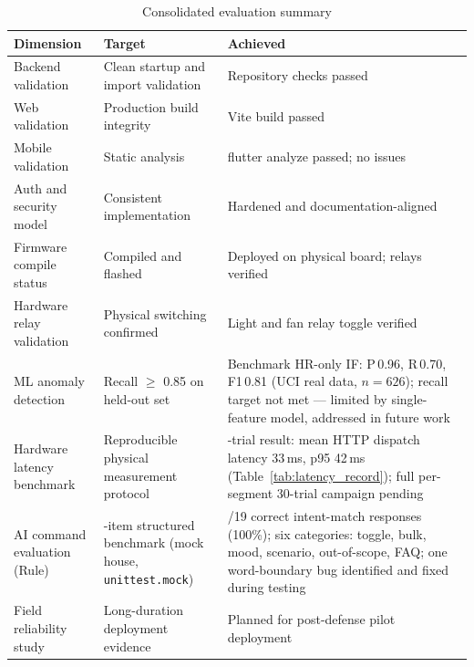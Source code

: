 \begin{table}[H]
\centering
\caption{Consolidated evaluation summary}
\label{tab:eval_summary}
\footnotesize
\setlength{\tabcolsep}{3pt}
\begin{tabular}{>{\raggedright\arraybackslash}p{3.6cm} >{\raggedright\arraybackslash}p{4.2cm} >{\raggedright\arraybackslash}p{6.8cm}}
\toprule
\textbf{Dimension} & \textbf{Target} & \textbf{Achieved} \\
\midrule
Backend validation           & Clean startup and import validation & Repository checks passed \\
Web validation               & Production build integrity & Vite build passed \\
Mobile validation            & Static analysis & flutter analyze passed; no issues \\
Auth and security model      & Consistent implementation & Hardened and documentation-aligned \\
Firmware compile status      & Compiled and flashed & Deployed on physical board; relays verified \\
Hardware relay validation    & Physical switching confirmed & Light and fan relay toggle verified \\
ML anomaly detection         & Recall $\geq$ 0.85 on held-out set & Benchmark HR-only IF: P\,0.96, R\,0.70, F1\,0.81 (UCI real data, $n=626$); recall target not met --- limited by single-feature model, addressed in future work \\
Hardware latency benchmark   & Reproducible physical measurement protocol & 10-trial result: mean HTTP dispatch latency 33\,ms, p95 42\,ms (Table~\ref{tab:latency_record}); full per-segment 30-trial campaign pending \\
AI command evaluation (Rule) & 19-item structured benchmark (mock house, \texttt{unittest.mock}) & 19/19 correct intent-match responses (100\%); six categories: toggle, bulk, mood, scenario, out-of-scope, FAQ; one word-boundary bug identified and fixed during testing \\
Field reliability study      & Long-duration deployment evidence & Planned for post-defense pilot deployment \\
\bottomrule
\end{tabular}
\end{table}

